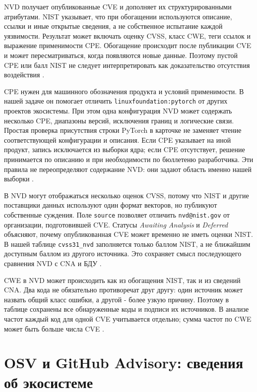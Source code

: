 \documentclass[12pt,a4paper]{report}
\begin{document}
NVD получает опубликованные CVE и дополняет их структурированными атрибутами. NIST указывает, что при обогащении используются описание, ссылки и иные открытые сведения, а не собственное испытание каждой уязвимости. Результат может включать оценку CVSS, класс CWE, теги ссылок и выражение применимости CPE. Обогащение происходит после публикации CVE и может пересматриваться, когда появляются новые данные. Поэтому пустой CPE или балл NIST не следует интерпретировать как доказательство отсутствия воздействия \cite{nvdgeneral,nvdstatus}.

CPE нужен для машинного обозначения продукта и условий применимости. В нашей задаче он помогает отличить \texttt{linuxfoundation:pytorch} от других проектов экосистемы. При этом одна конфигурация NVD может содержать несколько CPE, диапазоны версий, исключения границ и логические связи. Простая проверка присутствия строки PyTorch в карточке не заменяет чтение соответствующей конфигурации и описания. Если CPE указывает на иной продукт, запись исключается из выборки ядра; если CPE отсутствует, решение принимается по описанию и при необходимости по бюллетеню разработчика. Эти правила не переопределяют содержание NVD: они задают область именно нашей выборки \cite{nvdapi,nvddetail}.

В NVD могут отображаться несколько оценок CVSS, потому что NIST и другие поставщики данных используют один формат векторов, но публикуют собственные суждения. Поле \texttt{source} позволяет отличить \texttt{nvd@nist.gov} от организации, подготовившей CVE. Статусы \emph{Awaiting Analysis} и \emph{Deferred} объясняют, почему опубликованная CVE может временно не иметь оценки NIST. В нашей таблице \texttt{cvss31\_nvd} заполняется только баллом NIST, а не ближайшим доступным баллом из другого источника. Это сохраняет смысл последующего сравнения NVD с CNA и БДУ \cite{nvdstatus,nvdapi}.

CWE в NVD может происходить как из обогащения NIST, так и из сведений CNA. Два кода не обязательно противоречат друг другу: один источник может назвать общий класс ошибки, а другой - более узкую причину. Поэтому в таблице сохранены все обнаруженные коды и подписи их источников. В анализе частот каждый код для одной CVE учитывается отдельно; сумма частот по CWE может быть больше числа CVE \cite{nvddetail}.

\section{OSV и GitHub Advisory: сведения об экосистеме}
\end{document}
